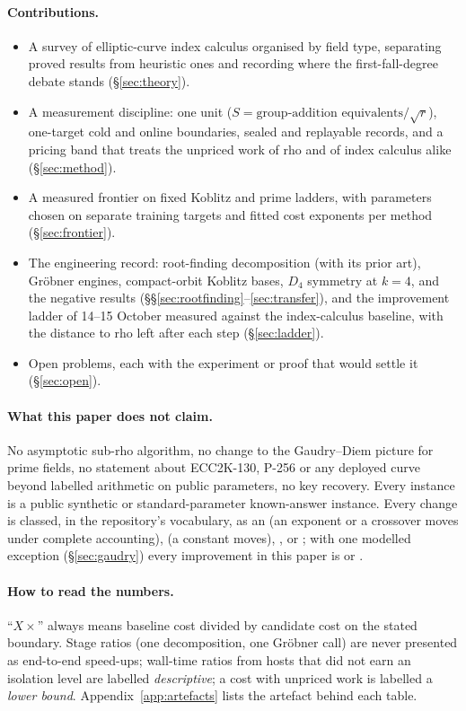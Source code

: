 \paragraph{Contributions.}
\begin{itemize}
\item A survey of elliptic-curve index calculus organised by field type,
  separating proved results from heuristic ones and recording where the
  first-fall-degree debate stands (\S\ref{sec:theory}).
\item A measurement discipline: one unit ($S=\text{group-addition
  equivalents}/\sqrt r$), one-target cold and online boundaries, sealed
  and replayable records, and a pricing band that treats the unpriced work
  of rho and of index calculus alike (\S\ref{sec:method}).
\item A measured frontier on fixed Koblitz and prime ladders, with
  parameters chosen on separate training targets and fitted cost exponents
  per method (\S\ref{sec:frontier}).
\item The engineering record: root-finding decomposition (with its prior
  art), Gr\"obner engines, compact-orbit Koblitz bases, $D_4$ symmetry at
  $k=4$, and the negative results (\S\S\ref{sec:rootfinding}--\ref{sec:transfer}),
  and the improvement ladder of 14--15 October measured against the
  index-calculus baseline, with the distance to rho left after each step
  (\S\ref{sec:ladder}).
\item Open problems, each with the experiment or proof that would settle it
  (\S\ref{sec:open}).
\end{itemize}

\paragraph{What this paper does not claim.} No asymptotic sub-rho
algorithm, no change to the Gaudry--Diem picture for prime fields, no
statement about ECC2K-130, P-256 or any deployed curve beyond labelled
arithmetic on public parameters, no key recovery. Every instance is a
public synthetic or standard-parameter known-answer instance. Every change
is classed, in the repository's vocabulary, as an  (an
exponent or a crossover moves under complete accounting),
 (a constant moves), , or
; with one modelled exception (\S\ref{sec:gaudry}) every
improvement in this paper is  or .

\paragraph{How to read the numbers.} ``$X\times$'' always means
baseline cost divided by candidate cost on the stated boundary. Stage
ratios (one decomposition, one Gr\"obner call) are never presented as
end-to-end speed-ups; wall-time ratios from hosts that did not earn an
isolation level are labelled \emph{descriptive}; a cost with unpriced work
is labelled a \emph{lower bound}. Appendix~\ref{app:artefacts} lists the
artefact behind each table.
